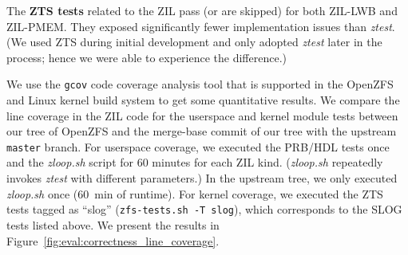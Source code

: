 \documentclass[12pt,a4paper,twoside]{book}
\begin{document}
{The \textbf{ZTS tests} related to the ZIL pass (or are skipped) for both ZIL-LWB and ZIL-PMEM.
They exposed significantly fewer implementation issues than \textit{ztest}.
(We used ZTS during initial development and only adopted \textit{ztest} later in the process; hence we were able to experience the difference.)

We use the \lstinline{gcov} code coverage analysis tool that is supported in the OpenZFS and Linux kernel build system to get some quantitative results.
We compare the line coverage in the ZIL code for the userspace and kernel module tests between our tree of \mbox{OpenZFS} and the merge-base commit of our tree with the upstream \lstinline{master} branch.
For userspace coverage, we executed the PRB/HDL tests once and the \textit{zloop.sh} script for 60 minutes for each ZIL kind.
(\textit{zloop.sh} repeatedly invokes \textit{ztest} with different parameters.)
In the upstream tree, we only executed \textit{zloop.sh} once (60~min of runtime).
For kernel coverage, we executed the ZTS tests tagged as ``slog'' (\lstinline{zfs-tests.sh -T slog}), which corresponds to the SLOG tests listed above.
We present the results in Figure~\ref{fig:eval:correctness_line_coverage}.

\newcommand{\cssubheader}[1]{\multicolumn{1}{c}{ \rotatebox[origin=c]{0}{\footnotesize #1} } }

}
\end{document}
